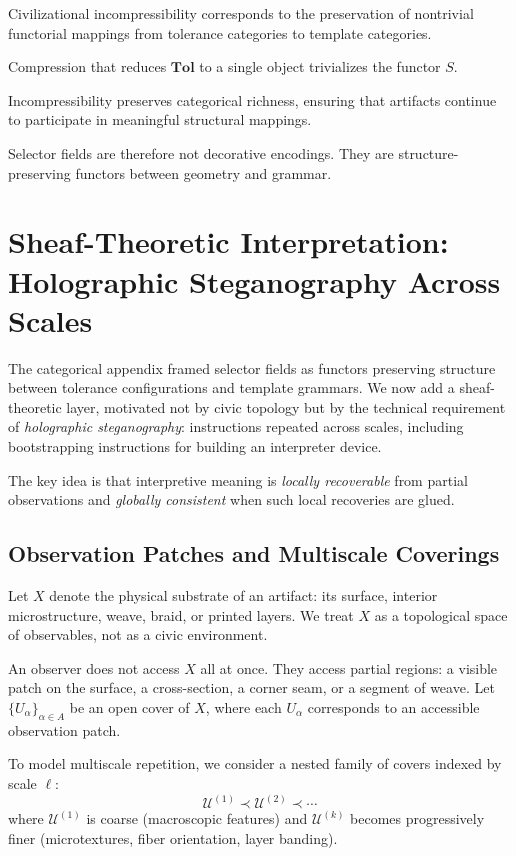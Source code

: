 \documentclass[11pt]{article}
\begin{document}
Civilizational incompressibility corresponds to
the preservation of nontrivial functorial mappings
from tolerance categories to template categories.

Compression that reduces $\mathbf{Tol}$
to a single object trivializes the functor $S$.

Incompressibility preserves categorical richness,
ensuring that artifacts continue to participate
in meaningful structural mappings.

Selector fields are therefore not decorative encodings.
They are structure-preserving functors
between geometry and grammar.

\section{Sheaf-Theoretic Interpretation: Holographic Steganography Across Scales}

The categorical appendix framed selector fields as functors preserving
structure between tolerance configurations and template grammars. We now
add a sheaf-theoretic layer, motivated not by civic topology but by the
technical requirement of \emph{holographic steganography}: instructions
repeated across scales, including bootstrapping instructions for building
an interpreter device.

The key idea is that interpretive meaning is \emph{locally recoverable}
from partial observations and \emph{globally consistent} when such local
recoveries are glued.

\subsection{Observation Patches and Multiscale Coverings}

Let $X$ denote the physical substrate of an artifact: its surface,
interior microstructure, weave, braid, or printed layers. We treat $X$
as a topological space of observables, not as a civic environment.

An observer does not access $X$ all at once. They access partial regions:
a visible patch on the surface, a cross-section, a corner seam, or a
segment of weave. Let $\{U_\alpha\}_{\alpha \in A}$ be an open cover of
$X$, where each $U_\alpha$ corresponds to an accessible observation
patch.

To model multiscale repetition, we consider a nested family of covers
indexed by scale $\ell$:
\[
\mathcal{U}^{(1)} \prec \mathcal{U}^{(2)} \prec \cdots
\]
where $\mathcal{U}^{(1)}$ is coarse (macroscopic features) and
$\mathcal{U}^{(k)}$ becomes progressively finer (microtextures, fiber
orientation, layer banding).
\end{document}
